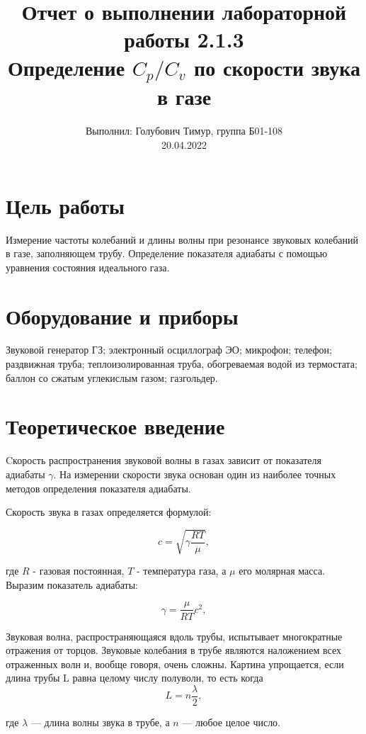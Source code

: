 \documentclass[12pt,a4paper]{article}
\author{\normalsize Выполнил: Голубович Тимур, группа Б01-108 \\
	\normalsize 20.04.2022}
\date{}
\title{
	\large Отчет о выполнении лабораторной работы 2.1.3 \\
	\Large Определение $C_p/C_v$ по скорости звука в газе \\ 
	
}
\begin{document}
	\maketitle
	
\section*{Цель работы}
Измерение частоты колебаний и длины волны при резонансе звуковых колебаний в газе, заполняющем трубу.
Определение показателя адиабаты с помощью уравнения состояния идеального газа.

\section*{Оборудование и приборы} 
Звуковой генератор ГЗ;
электронный осциллограф ЭО;
микрофон;
телефон;
раздвижная труба;
теплоизолированная труба, обогреваемая водой из термостата;
баллон со сжатым углекислым газом;
газгольдер.
	
\section*{Теоретическое введение}

	
Cкорость распространения звуковой волны в газах зависит от показателя адиабаты $\gamma$.
На измерении скорости звука основан один из наиболее  точных методов определения показателя  адиабаты.

Скорость звука в газах определяется формулой:

\begin{equation}
	c=\sqrt{\gamma\frac{RT}{\mu}},
\end{equation}

где $R$ - газовая постоянная, $T$ - температура газа, а $\mu$ его молярная масса.
Выразим показатель адиабаты:

\begin{equation}\label{g}
	\gamma=\frac{\mu}{RT} c^2,
\end{equation}

Звуковая волна, распространяющаяся вдоль трубы, испытывает многократные отражения от торцов.
Звуковые колебания в трубе являются наложением всех отраженных волн и, вообще говоря, очень сложны.
Картина упрощается, если длина трубы L равна целому числу полуволн, то есть когда
\begin{equation}
	L=n\frac{\lambda}{2},
\end{equation}

где $\lambda$ — длина волны звука в трубе, а $n$ — любое целое число.
\end{document}
